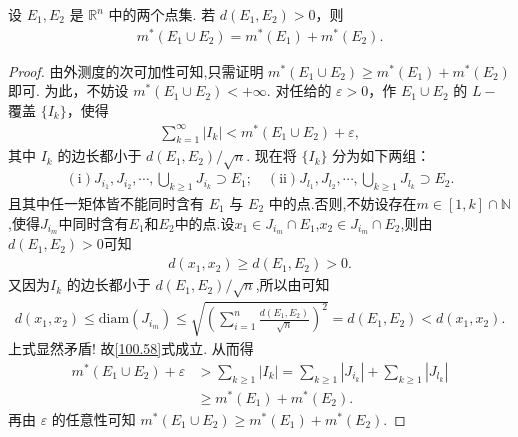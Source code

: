 \documentclass[../../main.tex]{subfiles}
\begin{document}
\begin{theorem}\label{theorem:距离大于零的两个点集的外测度满足可数可加性}
设 \(E_1, E_2\) 是 \(\mathbb{R}^n\) 中的两个点集. 若 \(d(E_1, E_2)>0\)，则
\begin{align*}
m^*(E_1 \cup E_2) = m^*(E_1) + m^*(E_2).
\end{align*}
\end{theorem}
\begin{proof}
由外测度的次可加性可知,只需证明 \(m^*(E_1 \cup E_2) \geqslant  m^*(E_1) + m^*(E_2)\) 即可. 为此，不妨设 \(m^*(E_1 \cup E_2)< + \infty\). 对任给的 \(\varepsilon > 0\)，作 \(E_1 \cup E_2\) 的 \(L -\)覆盖 \(\{I_k\}\)，使得
\begin{align*}
\sum_{k = 1}^{\infty} |I_k| < m^*(E_1 \cup E_2) + \varepsilon,
\end{align*}
其中 \(I_k\) 的边长都小于 \(d(E_1, E_2)/\sqrt{n}\). 现在将 \(\{I_k\}\) 分为如下两组：
\begin{align}
(\text{i})J_{i_1}, J_{i_2}, \cdots,\bigcup_{k \geqslant  1} J_{i_k} \supset E_1 ; \quad (\text{ii})J_{l_1}, J_{l_2}, \cdots,\bigcup_{k \geqslant  1} J_{l_k} \supset E_2.\label{100.58}
\end{align}
且其中任一矩体皆不能同时含有 \(E_1\) 与 \(E_2\) 中的点.否则,不妨设存在$m\in [1,k]\cap \mathbb{N}$,使得$J_{i_m}$中同时含有$E_1$和$E_2$中的点.设$x_1\in J_{i_m}\cap E_1$,$x_2\in J_{i_m}\cap E_2$,则由$d(E_1,E_2)>0$可知
\begin{align*}
d(x_1,x_2) \geqslant d(E_1,E_2) > 0.
\end{align*}
又因为\(I_k\) 的边长都小于 \(d(E_1, E_2)/\sqrt{n}\),所以由可知
\begin{align*}
d(x_1,x_2)\leqslant \mathrm{diam}\left( J_{i_m} \right) \leqslant \sqrt{\left( \sum_{i=1}^n{\frac{d\left( E_1,E_2 \right)}{\sqrt{n}}} \right) ^2}=d(E_1,E_2)<d(x_1,x_2).
\end{align*}
上式显然矛盾!
故\eqref{100.58}式成立.
从而得
\begin{align*}
m^*(E_1 \cup E_2) + \varepsilon &> \sum_{k \geqslant  1} |I_k| = \sum_{k \geqslant  1} |J_{i_k}| + \sum_{k \geqslant  1} |J_{l_k}| \\
&\geqslant  m^*(E_1) + m^*(E_2).
\end{align*}
再由 \(\varepsilon\) 的任意性可知 \(m^*(E_1 \cup E_2) \geqslant  m^*(E_1) + m^*(E_2)\). 

\end{proof}
\end{document}

